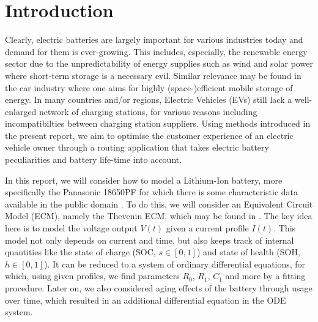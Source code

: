 \documentclass{prettytex/ox/mmsc-special-topic}
\title{\topictitle}
\author{Candidate \candidatenumber}
\date{\today}
\begin{document}
  \pagestyle{plain}
  \mmscSpecialHeader[casestudy]

  \begin{abstract}
    \label{abstract}
    This work will attempt to

  \end{abstract}

  \tableofcontents

  \pagebreak
  \pagestyle{normal}

  \section{Introduction}
  Clearly, electric batteries are largely important for various industries today and demand for them is ever-growing.
  This includes, especially, the renewable energy sector due to the unpredictability of energy supplies such as wind and solar power where short-term storage is a necessary evil.
  Similar relevance may be found in the car industry where one aims for highly (space-)efficient mobile storage of energy.
  In many countries and/or regions, Electric Vehicles (EVs) still lack a well-enlarged network of charging stations, for various reasons including incompatibilties between charging station suppliers.
  Using methods introduced in the present report, we aim to optimise the customer experience of an electric vehicle owner through a routing application that takes electric battery peculiarities and battery life-time into account.

  In this report, we will consider how to model a Lithium-Ion battery, more specifically the Panasonic 18650PF for which there is some characteristic data available in the public domain \parencite{panasonicnums}.
  To do this, we will consider an Equivalent Circuit Model (ECM), namely the Thevenin ECM, which may be found in .
  The key idea here is to model the voltage output $V(t)$ given a current profile $I(t)$.
  This model not only depends on current and time, but also keeps track of internal quantities like the state of charge (SOC, $s \in [0, 1]$) and state of health (SOH, $h \in [0, 1]$).
  It can be reduced to a system of ordinary differential equations, for which, using given profiles, we find parameters $R_0$, $R_1$, $C_1$ and more by a fitting procedure.
  Later on, we also considered aging effects of the battery through usage over time, which resulted in an additional differential equation in the ODE system.
\end{document}
